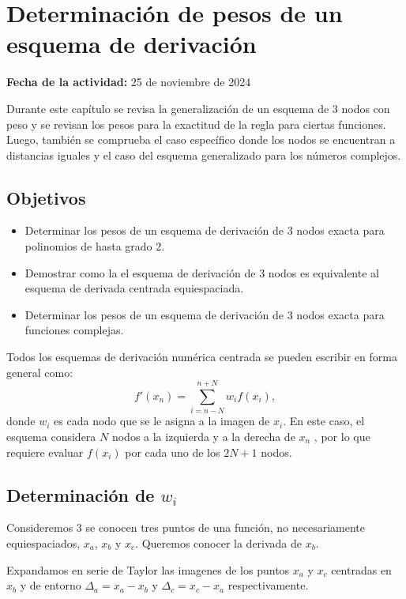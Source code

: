 \documentclass[../portafolio.tex]{subfiles}
\begin{document}
\chapter{Determinación de pesos de un esquema de derivación}
\label{g2_ej6}
\hfill \textbf{Fecha de la actividad:} 25 de noviembre de 2024

\medskip

Durante este capítulo se revisa la generalización de un esquema de 3 nodos con peso y se revisan los pesos para la exactitud de la regla para ciertas funciones. Luego, también se comprueba el caso específico donde los nodos se encuentran a distancias iguales y el caso del esquema generalizado para los números complejos.
\section*{Objetivos}
\begin{itemize}
\item Determinar los pesos de un esquema de derivación de 3 nodos exacta para polinomios de hasta grado 2.
\item Demostrar como la el esquema de derivación de 3 nodos es equivalente al esquema de derivada centrada equiespaciada.
\item Determinar los pesos de un esquema de derivación de 3 nodos exacta para funciones complejas.
\end{itemize}

Todos los esquemas de derivación numérica centrada se pueden escribir en forma general como: 
\begin{equation} \label{g2_ej6:condicion}
f'(x_n)=\sum_{i=n-N}^{n+N} w_i f(x_i) , 
\end{equation}
donde $w_i$ es cada nodo que se le asigna a la imagen de $x_i$. En este caso, el esquema considera $N$ nodos a la izquierda y a la derecha de
$x_n$ , por lo que requiere evaluar $f (x_i)$ por cada uno de los $2N + 1$ nodos.

\section{Determinación de $w_i$}

Consideremos 3 se conocen tres puntos de una función, no necesariamente equiespaciados, $x_a$, $x_b$ y $x_c$. Queremos conocer la derivada de $x_b$.

Expandamos en serie de Taylor \citep{Stewart2001} las imagenes de los puntos $x_a$ y $x_c$ centradas en $x_b$ y de entorno $\Delta_a=x_a -x_b$ y $\Delta_c=x_c - x_a$ respectivamente.
\end{document}
